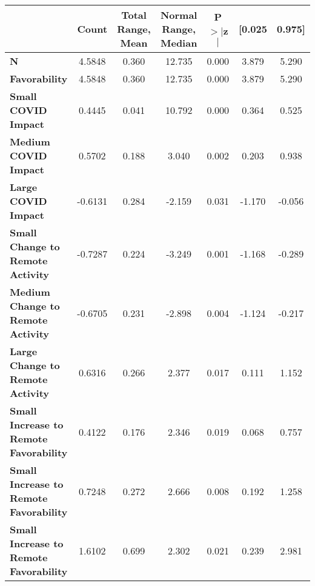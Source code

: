 {
\def\sym#1{\ifmmode^{#1}\else\(^{#1}\)\fi}
    \begin{tabular}{lcccccc}
    \toprule
                                       & \textbf{Count} & \textbf{Total Range, Mean} & \textbf{Normal Range, Median} & \textbf{P$> |$z$|$} & \textbf{[0.025} & \textbf{0.975]}  \\
    \midrule
    \textbf{N}                                 &       4.5848  &        0.360     &    12.735  &         0.000        &        3.879    &        5.290     \\
    \textbf{Favorability}                                 &       4.5848  &        0.360     &    12.735  &         0.000        &        3.879    &        5.290     \\
    \textbf{Small COVID Impact}                  &       0.4445  &        0.041     &    10.792  &         0.000        &        0.364    &        0.525     \\
    \textbf{Medium COVID Impact}         &       0.5702  &        0.188     &     3.040  &         0.002        &        0.203    &        0.938     \\
    \textbf{Large COVID Impact}    &      -0.6131  &        0.284     &    -2.159  &         0.031        &       -1.170    &       -0.056     \\
    \textbf{Small Change to Remote Activity} &      -0.7287  &        0.224     &    -3.249  &         0.001        &       -1.168    &       -0.289     \\
    \textbf{Medium Change to Remote Activity}   &      -0.6705  &        0.231     &    -2.898  &         0.004        &       -1.124    &       -0.217     \\
    \textbf{Large Change to Remote Activity}                          &       0.6316  &        0.266     &     2.377  &         0.017        &        0.111    &        1.152     \\
    \textbf{Small Increase to Remote Favorability}         &       0.4122  &        0.176     &     2.346  &         0.019        &        0.068    &        0.757     \\
    \textbf{Small Increase to Remote Favorability}                   &       0.7248  &        0.272     &     2.666  &         0.008        &        0.192    &        1.258     \\
    \textbf{Small Increase to Remote Favorability}                          &       1.6102  &        0.699     &     2.302  &         0.021        &        0.239    &        2.981     \\
    \bottomrule
    \end{tabular}
}

